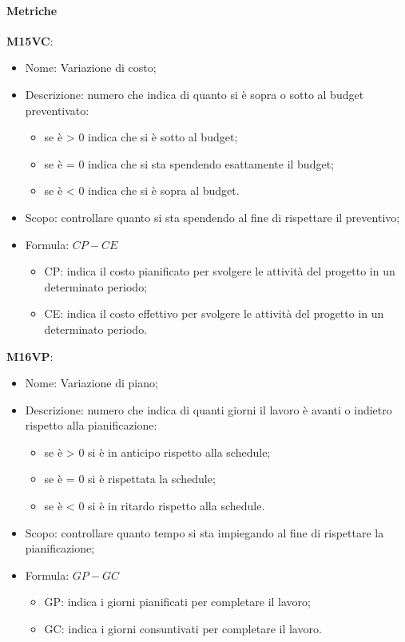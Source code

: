 \paragraph{Metriche}
\textbf{M15VC}:
\begin{itemize}
    \item Nome: Variazione di costo;
    \item Descrizione: numero che indica di quanto si è sopra o sotto al budget preventivato:
         \begin{itemize}
            \item se è > 0 indica che si è sotto al budget;
            \item se è = 0 indica che si sta spendendo esattamente il budget;
            \item se è < 0 indica che si è sopra al budget.
        \end{itemize}
    \item Scopo: controllare quanto si sta spendendo al fine di rispettare il preventivo;
    \item Formula: $ CP - CE $
        \begin{itemize}
            \item CP: indica il costo pianificato per svolgere le attività del progetto in un determinato 
            periodo;
            \item CE: indica il costo effettivo per svolgere le attività del progetto in un determinato 
            periodo.
        \end{itemize}
\end{itemize}

\textbf{M16VP}:
\begin{itemize}
    \item Nome: Variazione di piano;
    \item Descrizione: numero che indica di quanti giorni il lavoro è avanti o indietro rispetto alla 
    pianificazione:
         \begin{itemize}
            \item se è > 0 si è in anticipo rispetto alla schedule;
            \item se è = 0 si è rispettata la schedule;
            \item se è < 0 si è in ritardo rispetto alla schedule.
        \end{itemize}
    \item Scopo: controllare quanto tempo si sta impiegando al fine di rispettare la pianificazione;
    \item Formula: $ GP - GC $
        \begin{itemize}
            \item GP: indica i giorni pianificati per completare il lavoro;
            \item GC: indica i giorni consuntivati per completare il lavoro.
        \end{itemize}
\end{itemize}